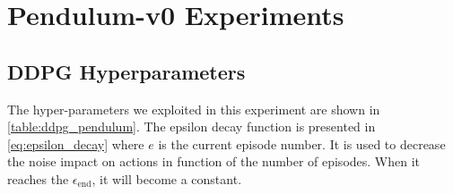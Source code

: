 \section{Pendulum-v0 Experiments} \label{sec:pendulum-exp}

\subsection{DDPG Hyperparameters}

The hyper-parameters we exploited in this experiment are shown in \vref{table:ddpg_pendulum}.
The epsilon decay function is presented in \vref{eq:epsilon_decay} where $e$ is the current episode number.
It is used to decrease the noise impact on actions in function of the number of episodes.
When it reaches the $\epsilon_{\text{end}}$, it will become a constant.

